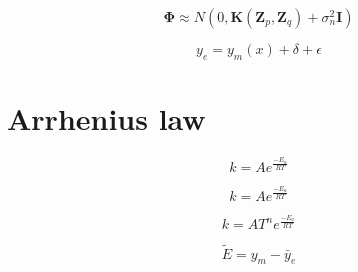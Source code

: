 \documentclass[20pt,twocolumn]{article}
\begin{document}
\begin{equation*}
\bm{\Phi} \approx N (0, \bm{K}(\bm{Z}_p, \bm{Z}_q) + \sigma_{n}^2 \bm{I})
\end{equation*}


\begin{equation*}
y_e = y_m(x) + \delta + \epsilon
\end{equation*}

\section{Arrhenius law}

\begin{equation*}
k = A e^{\frac{-E_a}{R T}}
\end{equation*}

\begin{equation*}
k = A e^{\frac{-E_a}{R T}}
\end{equation*}

\begin{equation*}
k = A T^n e^{\frac{-E_a}{R T}}
\end{equation*}



\begin{equation*}
\tilde{E} = y_m - \bar{y}_e
\end{equation*}
\end{document}
